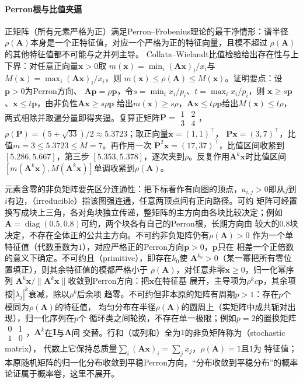 \paragraph{Perron根与比值夹逼}

正矩阵（所有元素严格为正）满足Perron--Frobenius理论的最干净情形：谱半径
$\rho(\bm A)$本身是一个正特征值，对应一个严格为正的特征向量，且模不超过
$\rho(\bm A)$的其他特征值都不可能与之并列主导。
Collatz--Wielandt比值检验给出存在性与上下界：对任意正向量$\bm x>0$取
$m(\bm x)=\min_i(\bm A\bm x)_i/x_i$与$M(\bm x)=\max_i(\bm A\bm x)_i/x_i$，则
$m(\bm x)\leq\rho(\bm A)\leq M(\bm x)$。证明要点：设$\bm p>0$为Perron方向、
$\bm A\bm p=\rho\bm p$，令$s=\min_i x_i/p_i$、$t=\max_i x_i/p_i$，则
$\bm x\geq s\bm p$、$\bm x\leq t\bm p$，由非负性$\bm A\bm x\geq s\rho\bm p$
给出$m(\bm x)\geq s\rho$，$\bm A\bm x\leq t\rho\bm p$给出$M(\bm x)\leq t\rho$，
两式相除并取遍分量即得夹逼。复算正矩阵$\bm P=\begin{smallmatrix}1&2\\3&4\end{smallmatrix}$，
$\rho(\bm P)=(5+\sqrt{33})/2\approx5.3723$；取正向量$\bm x=(1,1)^{\top}$，
$\bm P\bm x=(3,7)^{\top}$，比值$m=3\leq5.3723\leq M=7$。再作用一次
$\bm P^2\bm x=(17,37)^{\top}$，比值区间收紧到$[5.286,5.667]$，第三步
$[5.353,5.378]$，逐次夹到$\rho$。反复作用$\bm A^k\bm x$时比值区间
$[m(\bm A^k\bm x),M(\bm A^k\bm x)]$单调收紧到$\rho(\bm A)$。

元素含零的非负矩阵要先区分连通性：把下标看作有向图的顶点，$a_{i,j}>0$即从$j$到
$i$有边，（irreducible）指该图强连通，任意两顶点间有正向路径。可约
矩阵可经置换写成块上三角，各对角块独立传递，整矩阵的主方向由各块比较决定；例如
$\bm A=\operatorname{diag}(0.5,0.8)$可约，两个块各有自己的Perron根，长期方向由
较大的$0.8$块决定，不存在全体正的公共主方向。不可约非负矩阵仍有$\rho(\bm A)>0$
作为一个单特征值（代数重数为$1$），对应严格正的Perron方向$\bm p>0$，$\bm p$只在
相差一个正倍数的意义下确定。不可约且（primitive），即存在$k_0$使
$\bm A^{k_0}>0$（某一幂把所有零位置填正），则其余特征值的模都严格小于
$\rho(\bm A)$，对任意非零$\bm x\geq0$，归一化幂序列
$\bm A^k\bm x/\lVert\bm A^k\bm x\rVert$收敛到Perron方向：把$\bm x$在特征基
展开，主导项为$\rho^k c\bm p$，其余项按$|\lambda_j|^k$衰减，除以$\rho^k$后余项
趋零。不可约但非本原的矩阵有周期$p>1$：存在$p$个模同为$\rho(\bm A)$的特征值，
均匀分布在半径$\rho(\bm A)$的圆周上（实矩阵中成共轭对出现），归一化序列在$p$个
循环类之间轮换，不存在单一极限；例如$p=2$的置换矩阵
$\begin{smallmatrix}0&1\\1&0\end{smallmatrix}$，$\bm A^k$在$\bm I$与$\bm A$间
交替。行和（或列和）全为$1$的非负矩阵称为（stochastic matrix），
代数上它保持总质量$\sum_i(\bm A\bm x)_i=\sum_jx_j$，$\rho(\bm A)=1$且$1$为
特征值；本原随机矩阵的归一化分布收敛到平稳Perron方向，“分布收敛到平稳分布”的概率
论证属于概率卷，这里不展开。

